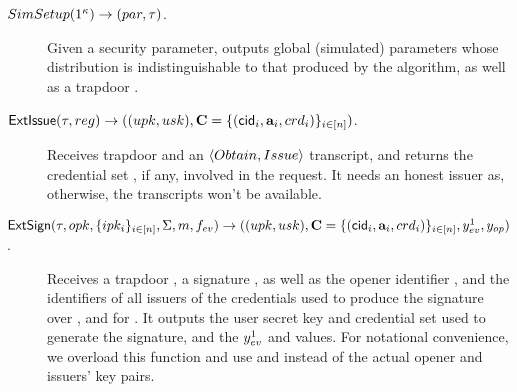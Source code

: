 \begin{description}
\item[$SimSetup(1^\kappa) \rightarrow (par,\tau)$.] Given a security
  parameter, outputs global (simulated) parameters \parm whose distribution is
  indistinguishable to that produced by the \Setup algorithm, as well as a
  trapdoor \trap.
\item[$\mathsf{ExtIssue}(\tau,reg) \rightarrow ((upk,usk),\mathbf{C}=
  \lbrace(\mathsf{cid}_i,\mathbf{a}_i,crd_i) \rbrace_{i \in [n]})$.]
  Receives trapdoor \trap and an $\langle Obtain, Issue \rangle$ transcript,
  and returns the credential set \sCred, if any, involved in the request. It
  needs an honest issuer as, otherwise, the transcripts won't be available. 
\item[$\mathsf{ExtSign}(\tau,opk,\lbrace ipk_i \rbrace_{i \in [n]},\Sigma,m,
  f_{ev}) \rightarrow ((upk,usk),\mathbf{C}=\lbrace(\mathsf{cid}_i,\mathbf{a}_i,crd_i)
  \rbrace_{i \in [n]},y_{ev}^1,y_{op})$.] Receives a trapdoor \trap, a signature
  \Sig, as well as the opener identifier \oid, and the identifiers of all
  issuers of the credentials used to produce the signature over \msg, and for
  \feval. It outputs the user secret key and credential set \sCred used to
  generate the signature, and the $y_{ev}^1$ and \yinsp values. For notational
  convenience, we overload this function and use \oid and \iid instead of the
  actual opener and issuers' key pairs.


\end{description}

